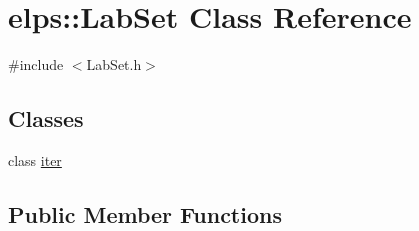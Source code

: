 \hypertarget{classelps_1_1_lab_set}{\section{elps\+:\+:Lab\+Set Class Reference}
\label{classelps_1_1_lab_set}
}


{\ttfamily \#include $<$Lab\+Set.\+h$>$}

\subsection*{Classes}
\begin{DoxyCompactItemize}
\item 
class \hyperlink{classelps_1_1_lab_set_1_1iter}{iter}
\end{DoxyCompactItemize}
\subsection*{Public Member Functions}
